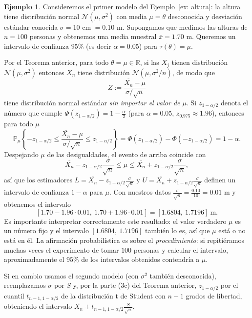\documentclass[12pt]{amsart}
\theoremstyle{definition}
\newtheorem{examplex}[lemma]{Ejemplo}
\renewcommand{\leq}{\leqslant}
\newcommand{\PP}{\ensuremath{\mathbb{P}}}
\newcommand{\RR}{\ensuremath{\mathbb{R}}}
\begin{document}
\begin{examplex} \label{ex: IC altura}
Consideremos el primer modelo del Ejemplo~\ref{ex: altura}: la altura tiene distribución normal $\mathcal{N}(\mu,\sigma^2)$ con media $\mu=\theta$ desconocida y desviación estándar conocida $\sigma=10$ cm $=0.10$ m. Supongamos que medimos las alturas de $n=100$ personas y obtenemos una media muestral $\overline{x}=1.70$ m. Queremos un intervalo de confianza $95\%$ (es decir $\alpha=0.05$) para $\tau(\theta)=\mu$.

Por el Teorema anterior, para todo $\theta=\mu\in\RR$, si las $X_j$ tienen distribución $\mathcal{N}(\mu,\sigma^2)$ entonces $\overline{X_n}$ tiene distribución $\mathcal{N}(\mu,\sigma^2/n)$, de modo que
\[Z:=\frac{\overline{X_n}-\mu}{\sigma/\sqrt{n}}\]
tiene distribución normal estándar \emph{sin importar el valor de $\mu$}. Si $z_{1-\alpha/2}$ denota el número que cumple $\Phi(z_{1-\alpha/2})=1-\frac{\alpha}{2}$ (para $\alpha=0.05$, $z_{0.975}\approx 1.96$), entonces para todo $\mu$
\[\PP_\mu\left\{-z_{1-\alpha/2}\leq \frac{\overline{X_n}-\mu}{\sigma/\sqrt{n}}\leq z_{1-\alpha/2}\right\}=\Phi(z_{1-\alpha/2})-\Phi(-z_{1-\alpha/2})=1-\alpha.\]
Despejando $\mu$ de las desigualdades, el evento de arriba coincide con
\[\overline{X_n}-z_{1-\alpha/2}\frac{\sigma}{\sqrt{n}}\leq \mu\leq \overline{X_n}+z_{1-\alpha/2}\frac{\sigma}{\sqrt{n}},\]
así que los estimadores $L=\overline{X_n}-z_{1-\alpha/2}\frac{\sigma}{\sqrt{n}}$ y $U=\overline{X_n}+z_{1-\alpha/2}\frac{\sigma}{\sqrt{n}}$ definen un intervalo de confianza $1-\alpha$ para $\mu$. Con nuestros datos $\frac{\sigma}{\sqrt{n}}=\frac{0.10}{10}=0.01$ m y obtenemos el intervalo
\[\left[1.70-1.96\cdot 0.01,\ 1.70+1.96\cdot 0.01\right]=[1.6804,\ 1.7196]\ \text{m}.\]
Es importante interpretar correctamente este resultado: el valor verdadero $\mu$ es un número fijo y el intervalo $[1.6804,\ 1.7196]$ también lo es, así que $\mu$ está o no está en él. La afirmación probabilística es sobre el \emph{procedimiento}: si repitiéramos muchas veces el experimento de tomar $100$ personas y calcular el intervalo, aproximadamente el $95\%$ de los intervalos obtenidos contendría a $\mu$.

Si en cambio usamos el segundo modelo (con $\sigma^2$ también desconocida), reemplazamos $\sigma$ por $S$ y, por la parte (3c) del Teorema anterior, $z_{1-\alpha/2}$ por el cuantil $t_{n-1,1-\alpha/2}$ de la distribución t de Student con $n-1$ grados de libertad, obteniendo el intervalo $\overline{X_n}\pm t_{n-1,1-\alpha/2}\frac{S}{\sqrt{n}}$.
\end{examplex}
\end{document}
